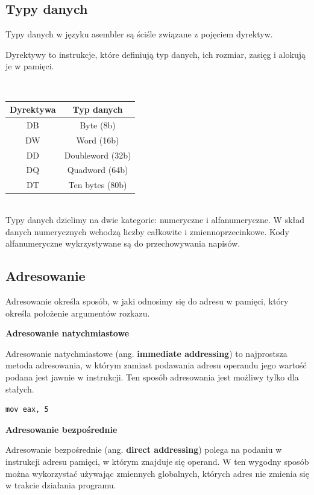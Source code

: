 \documentclass[a4paper,12pt]{article}
\begin{document}
\subsection{Typy danych}

Typy danych w języku asembler są ściśle związane z pojęciem dyrektyw.

Dyrektywy to instrukcje, które definiują typ danych, ich rozmiar, zasięg i alokują je w pamięci.

\\
\begin{center}
\begin{tabular}{|c|c|}
\hline 
Dyrektywa & Typ danych \\ 
\hline 
DB & Byte (8b) \\ 
\hline 
DW & Word (16b) \\ 
\hline 
DD & Doubleword (32b) \\ 
\hline 
DQ & Quadword (64b) \\ 
\hline 
DT & Ten bytes (80b) \\ 
\hline 
\end{tabular} 
\end{center}
\\

Typy danych dzielimy na dwie kategorie: numeryczne i alfanumeryczne. W skład danych numerycznych wchodzą liczby całkowite i zmiennoprzecinkowe. Kody alfanumeryczne wykrzystywane są do przechowywania napisów.

\subsection{Adresowanie}

Adresowanie określa sposób, w jaki odnosimy się do adresu w pamięci, który określa położenie argumentów rozkazu.

\textbf{Adresowanie natychmiastowe}

Adresowanie natychmiastowe (ang. \textbf{immediate addressing}) to najprostsza metoda adresowania, w którym zamiast podawania adresu operandu jego wartość podana jest jawnie w instrukcji. Ten sposób adresowania jest możliwy tylko dla stałych.

\begin{lstlisting}
mov eax, 5
\end{lstlisting}

\textbf{Adresowanie bezpośrednie}

Adresowanie bezpośrednie (ang. \textbf{direct addressing}) polega na podaniu w instrukcji adresu pamięci, w którym znajduje się operand. W ten wygodny sposób można wykorzystać używając zmiennych globalnych, których adres nie zmienia się w trakcie działania programu.
\end{document}
